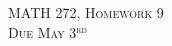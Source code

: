 \documentclass[12pt]{article} %
\begin{document}
\begin{center}
   \textsc{\large MATH 272, Homework 9}\\
   \textsc{Due May 3$^\textrm{rd}$}
\end{center}
\vspace{.5cm}
\end{document}
